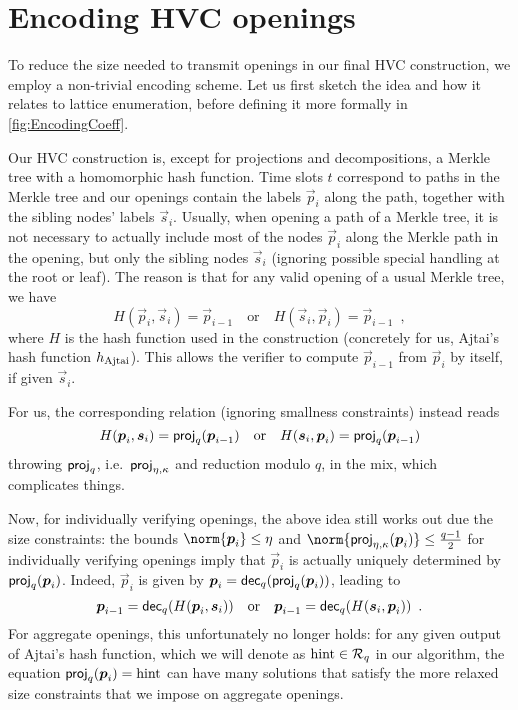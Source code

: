 \section{Encoding HVC openings}\label{sect:efficientencoding}



To reduce the size needed to transmit openings in our final HVC construction, we employ a non-trivial encoding scheme.
Let us first sketch the idea and how it relates to lattice enumeration, before defining it more formally in \autoref{fig:EncodingCoeff}.

Our HVC construction is, except for projections and decompositions, a Merkle tree with a homomorphic hash function.
Time slots $t$ correspond to paths in the Merkle tree and our openings contain the labels $\vec{p}_i$ along the path, together with the sibling nodes' labels $\vec{s}_i$.
Usually, when opening a path of a Merkle tree, it is not necessary to actually include most of the nodes $\vec{p}_i$ along the Merkle path in the opening, but only the sibling nodes $\vec{s}_i$ (ignoring possible special handling at the root or leaf).
The reason is that for any valid opening of a usual Merkle tree, we have 
\[
 H(\vec{p}_i,\vec{s}_i) = \vec{p}_{i-1} \quad\text{or}\quad H(\vec{s}_i,\vec{p}_i) = \vec{p}_{i-1}\enspace, 
\]
where $H$ is the hash function used in the construction (concretely for us, Ajtai's hash function $h_\mathrm{Ajtai}$).
This allows the verifier to compute $\vec{p}_{i-1}$ from $\vec{p}_{i}$ by itself, if given $\vec{s}_i$.

For us, the corresponding relation (ignoring smallness constraints) instead reads
\[
 H(\boldsymbol{p}_i,\boldsymbol{s}_i) =  \mathsf{proj}_{q}(\boldsymbol{p}_{i-1})  \quad\text{or}\quad H(\boldsymbol{s}_i,\boldsymbol{p}_i) = \mathsf{proj}_{q}(\boldsymbol{p}_{i-1})
\]
throwing $\mathsf{proj}_{q}$, i.e.\ $\mathsf{proj}_{\eta,\kappa}$ and reduction modulo $q$, in the mix, which complicates things.

Now, for individually verifying openings, the above idea still works out due the size constraints:
the bounds $\norm{\vec{p}_i} \leq \eta$ and $\norm{\projring(\vec{p}_i)}\leq \tfrac{q-1}{2}$ for individually verifying openings imply that $\vec{p}_i$ is actually uniquely determined by $\mathsf{proj}_{q}(\boldsymbol{p}_i)$.
Indeed, $\vec{p}_i$ is given by $\boldsymbol{p}_i = \mathsf{dec}_{q}(\mathsf{proj}_{q}(\boldsymbol{p}_i))$, leading to
\[
 \boldsymbol{p}_{i-1} = \mathsf{dec}_{q}(H(\boldsymbol{p}_i,\boldsymbol{s}_i))\quad\text{or}\quad \boldsymbol{p}_{i-1} = \mathsf{dec}_{q}(H(\boldsymbol{s}_i,\boldsymbol{p}_i))\enspace.
\]
For aggregate openings, this unfortunately no longer holds:
for any given output of Ajtai's hash function, which we will denote as $\mathrm{hint}\in\mathcal{R}_q$ in our algorithm, the equation $\mathsf{proj}_{q}(\boldsymbol{p}_i) = \mathrm{hint}$ can have many solutions that satisfy the more relaxed size constraints that we impose on aggregate openings.

